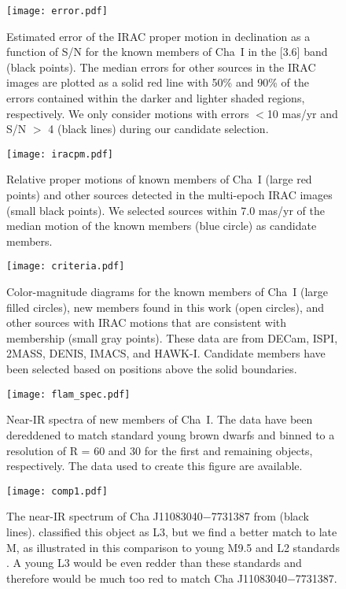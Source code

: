 \documentclass{emulateapj}
\begin{document}
\begin{figure}[h]
\centering
\texttt{[image: error.pdf]}
\caption{
Estimated error of the IRAC proper motion in declination 
as a function of S/N for the known members of Cha~I in the [3.6] band (black points).
The median errors for other sources in the IRAC images are plotted as a solid red line 
with 50\% and 90\% of the errors contained within the darker and lighter shaded regions,
respectively. 
We only consider motions with errors $<$10 mas/yr and S/N $>$ 4 (black lines)
during our candidate selection.
}
\label{fig:iracerror}
\end{figure}

\begin{figure}[h]
\centering
\texttt{[image: iracpm.pdf]}
\caption{
Relative proper motions of known members of Cha~I (large red points) and other 
sources detected in the multi-epoch IRAC images (small black points).
We selected sources within 7.0 mas/yr of the median motion of the known members (blue circle)
as candidate members.
}
\label{fig:iracmu}
\end{figure}

\begin{figure}[h]
\centering
\texttt{[image: criteria.pdf]}
\caption{
Color-magnitude diagrams for the known members of Cha~I (large filled circles),
new members found in this work (open circles),
and other sources with IRAC motions that are 
consistent with membership (small gray points).
These data are from DECam, ISPI, 2MASS, DENIS, IMACS, and HAWK-I. 
Candidate members have been selected based on positions above the solid boundaries.
}
\label{fig:crit}
\end{figure}

\begin{figure}[h]
\centering
\texttt{[image: flam\_spec.pdf]}
\caption{
Near-IR spectra of new members of Cha~I. The data have been dereddened
to match standard young brown dwarfs \citep{luh16b}
and binned to a resolution of R = 60 and 30 for the first and remaining
objects, respectively. The data used to create this figure are available.
}
\label{fig:spec}
\end{figure}

\begin{figure}[h]
\centering
\texttt{[image: comp1.pdf]}
\caption{
The near-IR spectrum of Cha J11083040$-$7731387 from \cite{luhm07}
(black lines). \cite{muz15} classified this object as L3,
but we find a better match to late M, as illustrated in this comparison
to young M9.5 and L2 standards \citep[red lines,][]{luh16b}. 
A young L3 would be even redder than these standards
and therefore would be much too red to match Cha J11083040$-$7731387.
}
\label{fig:l3}
\end{figure}
\end{document}
